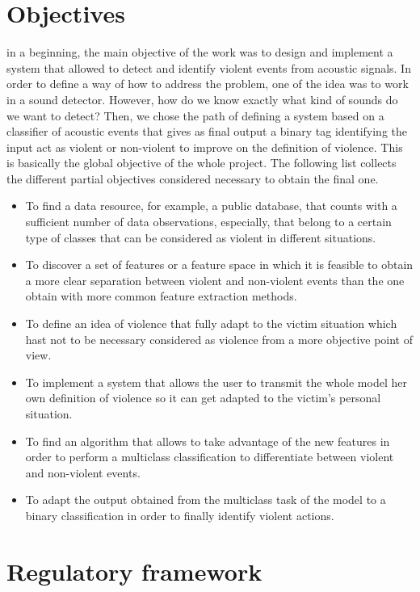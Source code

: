 	
\section{Objectives}

	in a beginning, the main objective of the work was to design and implement a system that allowed to detect and identify violent events from acoustic signals. In order to define a way of how to address the problem, one of the idea was to work in a sound detector. However, how do we know exactly what kind of sounds do we want to detect? Then, we chose the path of defining a system based on a classifier of acoustic events that gives as final output a binary tag identifying the input act as violent or non-violent to improve on the definition of violence. This is basically the global objective of the whole project. The following list collects the different partial objectives considered necessary to obtain the final one.
	
	\begin{itemize}
		\item To find a data resource, for example, a public database, that counts with a sufficient number of data observations, especially, that belong to a certain type of classes that can be considered as violent in different situations.
		\item To discover a set of features or a feature space in which it is feasible to obtain a more clear separation between violent and non-violent events than the one obtain with more common feature extraction methods.
		\item To define an idea of violence that fully adapt to the victim situation which hast not to be necessary considered as violence from a more objective point of view.
		\item To implement a system that allows the user to transmit the whole model her own definition of violence so it can get adapted to the victim's personal situation.
		\item To find an algorithm that allows to take advantage of the new features in order to perform a multiclass classification to differentiate between violent and non-violent events.
		\item To adapt the output obtained from the multiclass task of the model to a binary classification in order to finally identify violent actions.
	\end{itemize}
		
\section{Regulatory framework}

